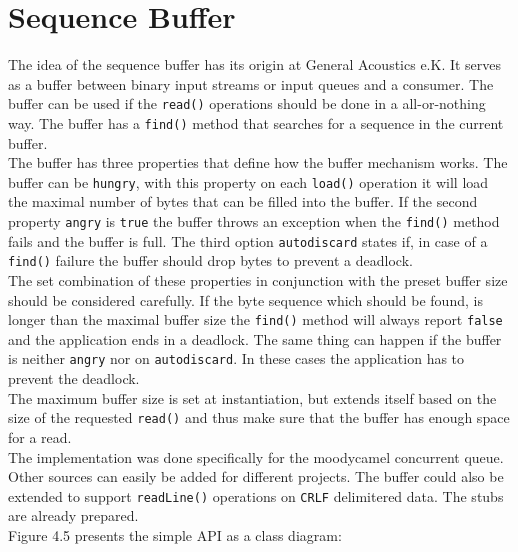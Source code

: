 \section{Sequence Buffer}
The idea of the sequence buffer has its origin at General Acoustics e.K. It serves as a buffer between binary input streams or input queues and a consumer. The buffer can be used if the \texttt{read()} operations should be done in a all-or-nothing way. The buffer has a \texttt{find()} method that searches for a sequence in the current buffer.\\
The buffer has three properties that define how the buffer mechanism works. The buffer can be \texttt{hungry}, with this property on each \texttt{load()} operation it will load the maximal number of bytes that can be filled into the buffer. If the second property \texttt{angry} is \texttt{true} the buffer throws an exception when the \texttt{find()} method fails and the buffer is full. The third option \texttt{autodiscard} states if, in case of a  \texttt{find()} failure the buffer should drop bytes to prevent a deadlock.\\
The set combination of these properties in conjunction with the preset buffer size should be considered carefully. If the byte sequence which should be found, is longer than the maximal buffer size the \texttt{find()} method will always report \texttt{false} and the application ends in a deadlock. The same thing can happen if the buffer is neither \texttt{angry} nor on \texttt{autodiscard}. In these cases the application has to prevent the deadlock.\\
The maximum buffer size is set at instantiation, but extends itself based on the size of the requested \texttt{read()} and thus make sure that the buffer has enough space for a read.\\
The implementation was done specifically for the moodycamel concurrent queue. Other sources can easily be added for different projects. The buffer could also be extended to support \texttt{readLine()} operations on \texttt{CRLF} delimitered data. The stubs are already prepared.\\
Figure 4.5 presents the simple API as a class diagram:

